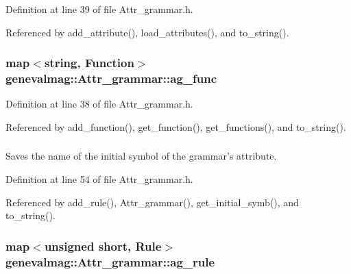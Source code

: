 Definition at line 39 of file Attr\_\-grammar.h.



Referenced by add\_\-attribute(), load\_\-attributes(), and to\_\-string().

\hypertarget{classgenevalmag_1_1Attr__grammar_a3ebc66b5f02a2c6806a6002dd09fc34f}{
\subsubsection[{ag\_\-func}]{\setlength{\rightskip}{0pt plus 5cm}map$<$string, {\bf Function}$>$ {\bf genevalmag::Attr\_\-grammar::ag\_\-func}}}
\label{classgenevalmag_1_1Attr__grammar_a3ebc66b5f02a2c6806a6002dd09fc34f}


Definition at line 38 of file Attr\_\-grammar.h.



Referenced by add\_\-function(), get\_\-function(), get\_\-functions(), and to\_\-string().

\hypertarget{classgenevalmag_1_1Attr__grammar_abdcc6aa17756d47b0e6e131b26050b42}{
\subsubsection[{ag\_\-initial\_\-symb}]{}}
\label{classgenevalmag_1_1Attr__grammar_abdcc6aa17756d47b0e6e131b26050b42}


Saves the name of the initial symbol of the grammar's attribute. 



Definition at line 54 of file Attr\_\-grammar.h.



Referenced by add\_\-rule(), Attr\_\-grammar(), get\_\-initial\_\-symb(), and to\_\-string().

\hypertarget{classgenevalmag_1_1Attr__grammar_a962f40d15bf80b0e10b27126bd149a93}{
\subsubsection[{ag\_\-rule}]{\setlength{\rightskip}{0pt plus 5cm}map$<$unsigned short, {\bf Rule}$>$ {\bf genevalmag::Attr\_\-grammar::ag\_\-rule}}}
\label{classgenevalmag_1_1Attr__grammar_a962f40d15bf80b0e10b27126bd149a93}



